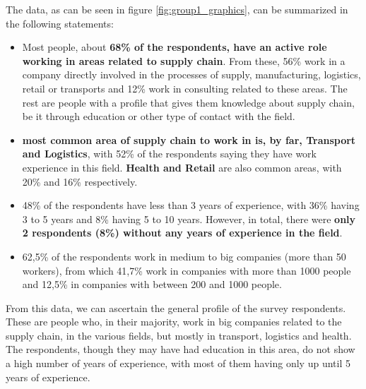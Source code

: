 The data, as can be seen in figure \ref{fig:group1_graphics}, can be summarized in the following statements:
\begin{itemize}
\item Most people, about \textbf{68\% of the respondents, have an active role working in areas related to supply chain}. From these, 56\% work in a company directly involved in the processes of supply, manufacturing, logistics, retail or transports and 12\% work in consulting related to these areas. The rest are people with a profile that gives them knowledge about supply chain, be it through education or other type of contact with the field.
\item \textbf{ most common area of supply chain to work in is, by far, Transport and Logistics}, with 52\% of the respondents saying they have work experience in this field. \textbf{Health and Retail} are also common areas, with 20\% and 16\% respectively.
\item 48\% of the respondents have less than 3 years of experience, with 36\% having 3 to 5 years and 8\% having 5 to 10 years. However, in total, there were \textbf{only 2 respondents (8\%) without any years of experience in the field}.
\item 62,5\% of the respondents work in medium to big companies (more than 50 workers), from which 41,7\% work in companies with more than 1000 people and 12,5\% in companies with between 200 and 1000 people.
\end{itemize}

From this data, we can ascertain the general profile of the survey respondents. These are people who, in their majority, work in big companies related to the supply chain, in the various fields, but mostly in transport, logistics and health. The respondents, though they may have had education in this area, do not show a high number of years of experience, with most of them having only up until 5 years of experience.